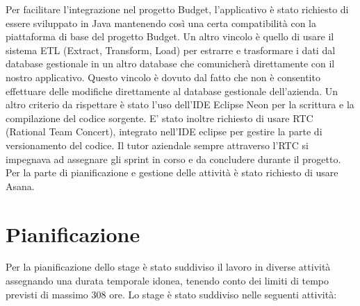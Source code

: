 Per facilitare l'integrazione nel progetto Budget, l'applicativo è stato richiesto di essere sviluppato in Java mantenendo così una certa compatibilità con la piattaforma di base del progetto Budget. Un altro vincolo è quello di usare il sistema ETL (Extract, Transform, Load) per estrarre e trasformare i dati dal database gestionale in un altro database che comunicherà direttamente con il nostro applicativo. Questo vincolo è dovuto dal fatto che non è consentito effettuare delle modifiche direttamente al database gestionale dell'azienda.
Un altro criterio da rispettare è stato l'uso  dell'IDE Eclipse Neon per la scrittura e la compilazione del codice sorgente. E' stato inoltre richiesto di usare RTC (Rational Team Concert), integrato nell'IDE eclipse per gestire la parte di versionamento del codice. Il tutor aziendale sempre attraverso l'RTC si impegnava ad assegnare gli sprint in corso e da concludere durante il progetto. Per la parte di pianificazione e gestione delle attività è stato richiesto di usare Asana.  \\

\section{Pianificazione}

Per la pianificazione dello stage è stato suddiviso il lavoro in diverse attività assegnando una durata temporale idonea, tenendo conto dei limiti di tempo previsti di massimo 308 ore. Lo stage è stato suddiviso nelle seguenti attività: \\

